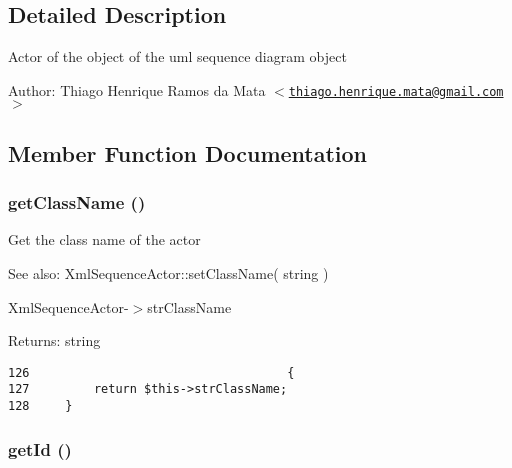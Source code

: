 \subsection{Detailed Description}
Actor of the object of the uml sequence diagram object \begin{Desc}
\item[Author:]Thiago Henrique Ramos da Mata $<$\href{mailto:thiago.henrique.mata@gmail.com}{\tt thiago.henrique.mata@gmail.com}$>$ \end{Desc}


\subsection{Member Function Documentation}
\hypertarget{class_xml_sequence_actor_b8f8ee56588ebf5091c288e44ebdfaf4}{
\subsubsection[{getClassName}]{\setlength{\rightskip}{0pt plus 5cm}getClassName ()}}
\label{class_xml_sequence_actor_b8f8ee56588ebf5091c288e44ebdfaf4}


Get the class name of the actor

\begin{Desc}
\item[See also:]XmlSequenceActor::setClassName( string ) 

XmlSequenceActor-$>$strClassName \end{Desc}
\begin{Desc}
\item[Returns:]string \end{Desc}


\begin{Code}\begin{verbatim}126                                    {
127         return $this->strClassName;
128     }
\end{verbatim}
\end{Code}


\hypertarget{class_xml_sequence_actor_12251d0c022e9e21c137a105ff683f13}{
\subsubsection[{getId}]{\setlength{\rightskip}{0pt plus 5cm}getId ()}}
\label{class_xml_sequence_actor_12251d0c022e9e21c137a105ff683f13}


